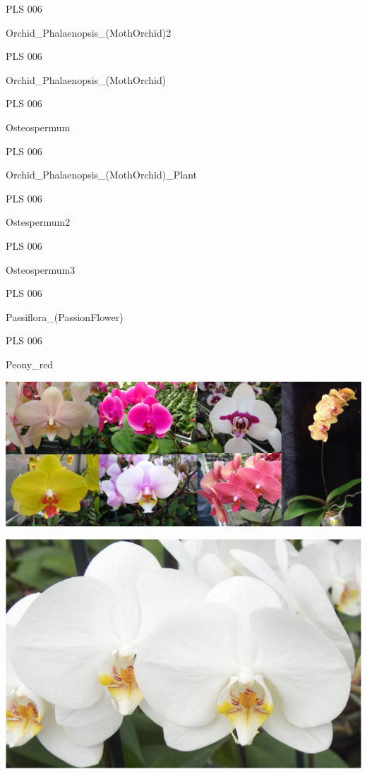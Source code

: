\documentclass{article}
\begin{document}
\noindent  PLS 006
\vfill
\centerline{{\huge Orchid\_Phalaenopsis\_(MothOrchid)2 }}
\vfill
\newpage

\noindent  PLS 006
\vfill
\centerline{{\huge Orchid\_Phalaenopsis\_(MothOrchid) }}
\vfill
\newpage

\noindent  PLS 006
\vfill
\centerline{{\huge Osteospermum }}
\vfill
\newpage

\noindent  PLS 006
\vfill
\centerline{{\huge Orchid\_Phalaenopsis\_(MothOrchid)\_Plant }}
\vfill
\newpage

\noindent  PLS 006
\vfill
\centerline{{\huge Ostespermum2 }}
\vfill
\newpage

\noindent  PLS 006
\vfill
\centerline{{\huge Osteospermum3 }}
\vfill
\newpage

\noindent  PLS 006
\vfill
\centerline{{\huge Passiflora\_(PassionFlower) }}
\vfill
\newpage

\noindent  PLS 006
\vfill
\centerline{{\huge Peony\_red }}
\vfill
\newpage

\begin{center}
\includegraphics[height=0.925\paperheight]{../Orchid_Phalaenopsis_(MothOrchid).jpg}
\end{center}
\newpage

\begin{center}
\includegraphics[height=0.925\paperheight]{../Orchid_Phalaenopsis_(MothOrchid)2.jpg}
\end{center}
\newpage
\end{document}
